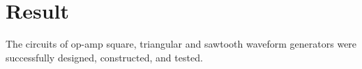 %
%
%
%

\section{Result}
The circuits of op-amp square, triangular and sawtooth waveform generators were successfully designed, constructed, and tested.

